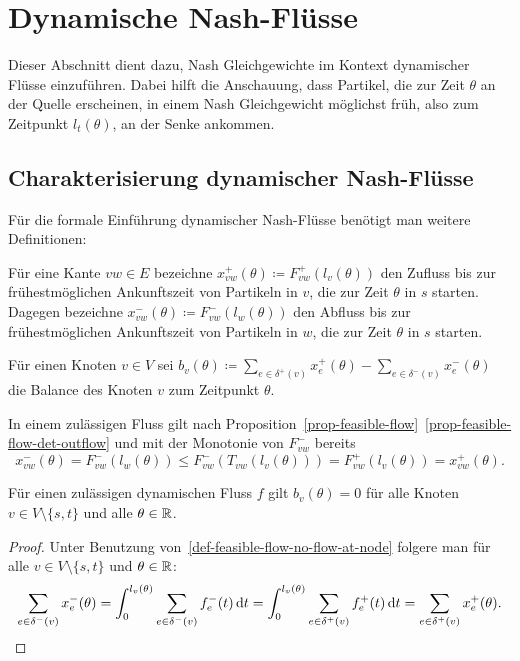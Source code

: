 \chapter{Dynamische Nash-Flüsse}\label{chapter-nash-flows}

Dieser Abschnitt dient dazu, Nash Gleichgewichte im Kontext dynamischer Flüsse einzuführen.
Dabei hilft die Anschauung, dass Partikel, die zur Zeit $\theta$ an der Quelle erscheinen, in einem Nash Gleichgewicht möglichst früh, also zum Zeitpunkt $l_t(\theta)$, an der Senke ankommen.

\section{Charakterisierung dynamischer Nash-Flüsse}


Für die formale Einführung dynamischer Nash-Flüsse benötigt man weitere Definitionen: 

\begin{definition}
	Für eine Kante $vw\in E$ bezeichne $x_{vw}^+(\theta)\coloneq F_{vw}^+(l_v(\theta))$ den Zufluss bis zur frühestmöglichen Ankunftszeit von Partikeln in $v$, die zur Zeit $\theta$ in $s$ starten.\\
	Dagegen bezeichne $x_{vw}^-(\theta)\coloneq F^-_{vw}(l_w(\theta))$ den Abfluss bis zur frühestmöglichen Ankunftszeit von Partikeln in $w$, die zur Zeit $\theta$ in $s$ starten.
	
	Für einen Knoten $v\in V$ sei $b_v(\theta)\coloneq \sum_{e\in\delta^+(v)} x_e^+(\theta) - \sum_{e\in\delta^-(v)} x_e^-(\theta)$ die Balance des Knoten $v$ zum Zeitpunkt $\theta$.
\end{definition}

\begin{remark}\label{remark-x^-leqx^+}
	In einem zulässigen Fluss gilt nach Proposition~\ref{prop-feasible-flow}~\ref{prop-feasible-flow-det-outflow} und mit der Monotonie von $F_{vw}^-$ bereits 
	\[
	x_{vw}^-(\theta) = F_{vw}^-(l_w(\theta)) \leq F_{vw}^-(T_{vw}(l_v(\theta)))=F_{vw}^+(l_v(\theta)) = x_{vw}^+(\theta).
	\]
\end{remark}

\begin{lemma}\label{lemma-balance-0}
	Für einen zulässigen dynamischen Fluss $f$ gilt $b_v(\theta)=0$ für alle Knoten $v\in V\setminus\{ s,t \}$ und alle $\theta\in\mathbb{R}$.
\end{lemma}
\begin{proof}
	Unter Benutzung von~\ref{def-feasible-flow-no-flow-at-node} folgere man für alle $v\in V\setminus \{ s, t\}$ und $\theta\in\mathbb{R}$:
	\[ \sum_{e\in\delta^-(v)} x_e^-(\theta) = \int_{0}^{l_v(\theta)} \sum_{e\in\delta^-(v)} f_e^-(t) \mathop{}\!\mathrm{d} t = \int_{0}^{l_v(\theta)} \sum_{e\in\delta^+(v)} f_e^+(t) \mathop{}\!\mathrm{d} t = \sum_{e\in\delta^+(v)}x_e^+(\theta). \]
\end{proof}

